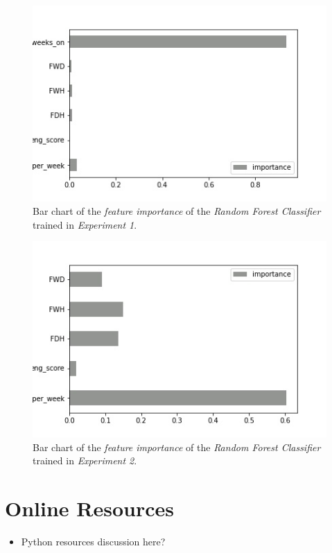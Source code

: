 \documentclass[sigplan,screen]{acmart}
\begin{document}
 \begin{figure}[h]
     \centering
     \includegraphics[width=0.5\linewidth]{reports/figures/feature_importance_rf_1.jpg}
     \caption{Bar chart of the \emph{feature importance} of the \emph{Random Forest Classifier} trained in \emph{Experiment 1}.}
     \label{fig:fi_rf_1}
 \end{figure}
 
 \begin{figure}[h]
     \centering
     \includegraphics[width=0.5\linewidth]{reports/figures/feature_importance_rf_2.jpg}
     \caption{Bar chart of the \emph{feature importance} of the \emph{Random Forest Classifier} trained in \emph{Experiment 2}.}
     \label{fig:fi_rf_2}
 \end{figure}

\section{Online Resources}

\begin{itemize}
    \item Python resources discussion here?
\end{itemize}
\end{document}
